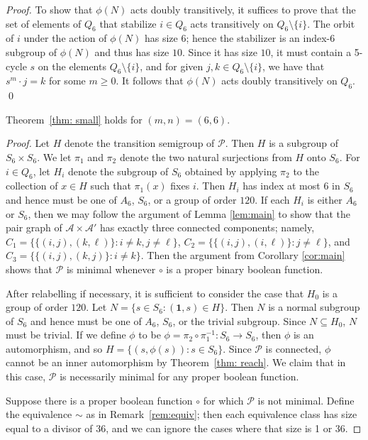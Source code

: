 \documentclass{llncs}
\newcommand{\cA}{{\mathcal A}}
\newcommand{\cP}{{\mathcal P}}
\newcommand{\one}{{\mathbf 1}}
\begin{document}
\begin{proof}
To show that $\phi(N)$ acts doubly transitively, it suffices to prove that the set of elements of $Q_6$ that stabilize $i\in Q_6$ acts transitively on $Q_6\setminus \{i\}$.   The orbit of $i$ under the action of $\phi(N)$ has size $6$; hence the stabilizer is an index-$6$ subgroup of $\phi(N)$ and thus has size $10$.   
Since it has size $10$, it must contain a 5-cycle $s$ on the elements $Q_6\setminus \{i\}$, and for given $j,k\in Q_6\setminus \{i\}$, we have that $s^m\cdot j=k$ for some $m\ge 0$.  
It follows that $\phi(N)$ acts doubly transitively on $Q_6$.  
\qed
\end{proof}
\begin{proposition}
Theorem~\ref{thm: small} holds for $(m,n)=(6,6)$.
\end{proposition}
\begin{proof}  Let $H$ denote the transition semigroup of $\cP$.  Then $H$ is a subgroup of $S_6\times S_6$.  We let $\pi_1$ and $\pi_2$ denote the two natural surjections from $H$ onto $S_6$.  For $i\in Q_6$, let $H_i$ denote the subgroup of $S_6$ obtained by applying $\pi_2$ to the collection of $x\in H$ such that $\pi_1(x)$ fixes $i$.  Then $H_i$ has index at most $6$ in $S_6$ and hence must be one of $A_6$, $S_6$, or a group of order $120$.  If each $H_i$ is either $A_6$ or $S_6$, then we may follow the argument of Lemma \ref{lem:main} to show that the pair graph of $\cA\times \cA'$ has exactly three connected components; namely,
$C_1=\{\{(i,j), (k,\ell)\}\colon i\neq k, j\neq \ell\}$, $C_2=\{\{(i,j), (i,\ell)\}\colon j\neq \ell\}$, and 
$C_3=\{\{(i,j), (k,j)\}\colon i\neq k\}$.  Then the argument from Corollary \ref{cor:main} shows that $\cP$ is minimal whenever $\circ$ is a proper binary boolean function.

After relabelling if necessary, it is sufficient to consider the case that $H_0$ is a group of order $120$.   Let $N=\{s\in S_6\colon (\one, s)\in H\}$.  Then $N$ is a normal subgroup of $S_6$ and hence must be one of  $A_6$, $S_6$, or the trivial subgroup.  
Since $N\subseteq H_0$, $N$ must be trivial.  
If we define $\phi$ to be $\phi=\pi_2\circ \pi_1^{-1}\colon S_6\to S_6$,
then $\phi$ is an automorphism, and so $H=\{(s,\phi(s))\colon s\in S_6\}$.   Since $\cP$ is connected,  $\phi$ cannot be an inner automorphism by Theorem~\ref{thm: reach}.  We claim that in this case, $\cP$ is necessarily minimal for any proper boolean function.


Suppose  there is a proper boolean function $\circ$ for which $\cP$ is not minimal.  
Define the equivalence $\sim$ as in Remark~\ref{rem:equiv};
then each equivalence class has size equal to a divisor of $36$, and we can ignore the cases where that size is 1 or 36.    


\end{proof}
\end{document}
